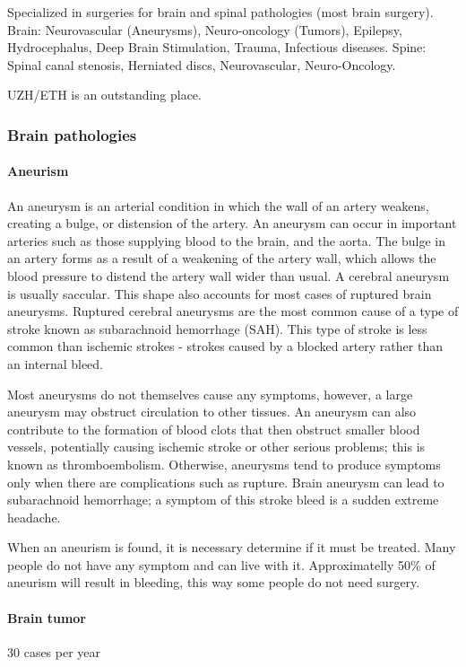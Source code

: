 \documentclass[12pt,article,oneside,a4paper]{memoir}
\begin{document}
Specialized in surgeries for brain and spinal pathologies (most brain surgery).
Brain: Neurovascular (Aneurysms), Neuro-oncology (Tumors), Epilepsy,
Hydrocephalus, Deep Brain Stimulation, Trauma, Infectious diseases.
Spine: Spinal canal stenosis, Herniated discs, Neurovascular, Neuro-Oncology.

UZH/ETH is an outstanding place.

\subsubsection{Brain pathologies}
\paragraph{Aneurism}
An aneurysm is an arterial condition in which the wall of an artery weakens,
creating a bulge, or distension of the artery. An aneurysm can occur in important
arteries such as those supplying blood to the brain, and the aorta. The bulge
in an artery forms as a result of a weakening of the artery wall, which allows
the blood pressure to distend the artery wall wider than usual. A cerebral
aneurysm is usually saccular. This shape also accounts for most cases of ruptured
brain aneurysms. Ruptured cerebral aneurysms are the most common cause of a type
of stroke known as subarachnoid hemorrhage (SAH). This type of stroke is less
common than ischemic strokes - strokes caused by a blocked artery rather than
an internal bleed.

Most aneurysms do not themselves cause any symptoms, however, a large aneurysm
may obstruct circulation to other tissues. An aneurysm can also contribute to
the formation of blood clots that then obstruct smaller blood vessels,
potentially causing ischemic stroke or other serious problems; this is known as
thromboembolism. Otherwise, aneurysms tend to produce symptoms only when there
are complications such as rupture. Brain aneurysm can lead to subarachnoid
hemorrhage; a symptom of this stroke bleed is a sudden extreme headache.

When an aneurism is found, it is necessary determine if it must be treated.
Many people do not have any symptom and can live with it. Approximatelly 50\% of
aneurism will result in bleeding, this way some people do not need surgery.

\paragraph{Brain tumor} 30 cases per year
\end{document}
